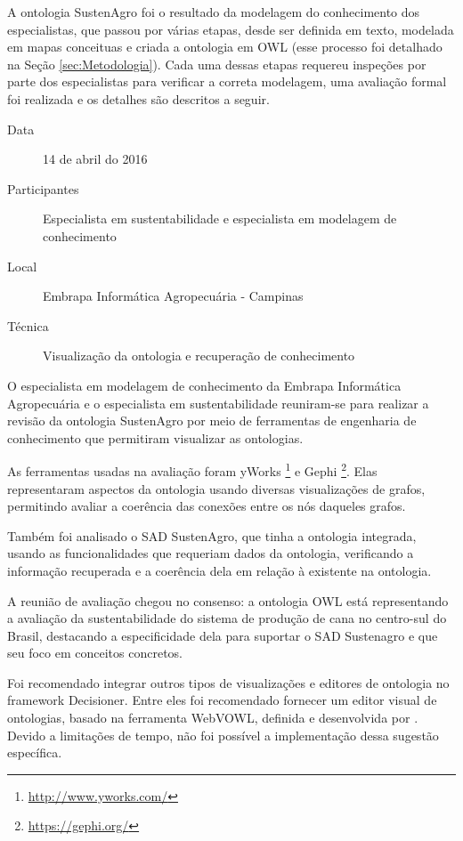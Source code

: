 A ontologia SustenAgro foi o resultado da modelagem do conhecimento
dos especialistas, que passou por várias etapas, desde ser definida
em texto, modelada em mapas conceituas e criada a ontologia em \foreignlanguage{english}{OWL}
(esse processo foi detalhado na Seção \ref{sec:Metodologia}). Cada
uma dessas etapas requereu inspeções por parte dos especialistas para
verificar a correta modelagem, uma avaliação formal foi realizada
e os detalhes são descritos a seguir.
\begin{description}
\item [{Data}] 14 de abril do 2016
\item [{Participantes}] Especialista em sustentabilidade e especialista
em modelagem de conhecimento
\item [{Local}] Embrapa Informática Agropecuária - Campinas
\item [{Técnica}] Visualização da ontologia e recuperação de conhecimento
\end{description}
O especialista em modelagem de conhecimento da Embrapa Informática
Agropecuária e o especialista em sustentabilidade reuniram-se para
realizar a revisão da ontologia SustenAgro por meio de ferramentas
de engenharia de conhecimento que permitiram visualizar as ontologias.

As ferramentas usadas na avaliação foram yWorks \footnote{\url{http://www.yworks.com/}}
e Gephi \footnote{\url{https://gephi.org/}}. Elas representaram aspectos
da ontologia usando diversas visualizações de grafos, permitindo avaliar
a coerência das conexões entre os nós daqueles grafos.

Também foi analisado o SAD SustenAgro, que tinha a ontologia integrada,
usando as funcionalidades que requeriam dados da ontologia, verificando
a informação recuperada e a coerência dela em relação à existente
na ontologia. 

A reunião de avaliação chegou no consenso: a ontologia \foreignlanguage{english}{OWL}
está representando a avaliação da sustentabilidade do sistema de produção
de cana no centro-sul do Brasil, destacando a especificidade dela
para suportar o SAD Sustenagro e que seu foco em conceitos concretos.

Foi recomendado integrar outros tipos de visualizações e editores
de ontologia no framework Decisioner. Entre eles foi recomendado fornecer
um editor visual de ontologias, basado na ferramenta \foreignlanguage{english}{WebVOWL,}
definida e desenvolvida por \citet{lohmann2014webvowl}. Devido a
limitações de tempo, não foi possível a implementação dessa sugestão
específica.

